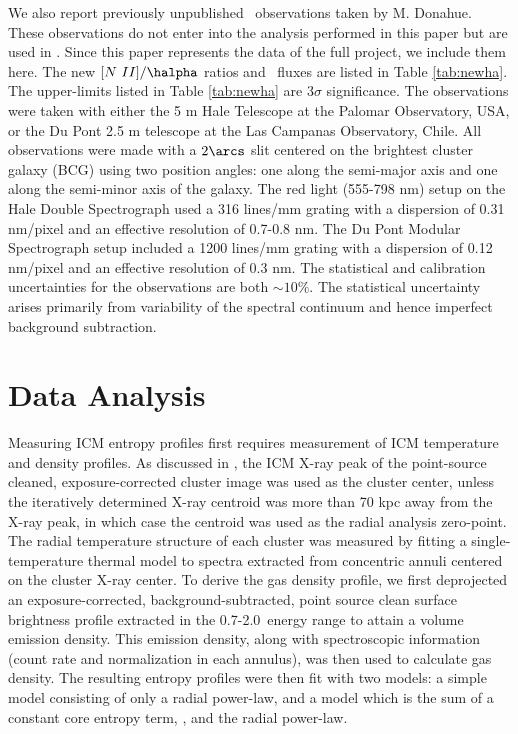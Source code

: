 \documentclass{emulateapj}
\begin{document}
We also report previously unpublished \halpha\ observations taken by
M. Donahue. These observations do not enter into the analysis
performed in this paper but are used in \citet{haradent}. Since this
paper represents the data of the full project, we include them
here. The new $[N~II]/\halpha$ ratios and \halpha\ fluxes are listed
in Table \ref{tab:newha}. The upper-limits listed in Table
\ref{tab:newha} are $3\sigma$ significance. The observations were
taken with either the 5 m Hale Telescope at the Palomar Observatory,
USA, or the Du Pont 2.5 m telescope at the Las Campanas Observatory,
Chile. All observations were made with a $2\arcs$ slit centered on the
brightest cluster galaxy (BCG) using two position angles: one along
the semi-major axis and one along the semi-minor axis of the
galaxy. The red light (555-798 nm) setup on the Hale Double
Spectrograph used a 316 lines/mm grating with a dispersion of 0.31
nm/pixel and an effective resolution of 0.7-0.8 nm. The Du Pont
Modular Spectrograph setup included a 1200 lines/mm grating with a
dispersion of 0.12 nm/pixel and an effective resolution of 0.3 nm. The
statistical and calibration uncertainties for the observations are
both $\sim 10\%$. The statistical uncertainty arises primarily from
variability of the spectral continuum and hence imperfect background
subtraction.

\section{Data Analysis}
\label{sec:data}

Measuring ICM entropy profiles first requires measurement of ICM
temperature and density profiles. As discussed in \citet{xrayband},
the ICM X-ray peak of the point-source cleaned, exposure-corrected
cluster image was used as the cluster center, unless the iteratively
determined X-ray centroid was more than 70 kpc away from the X-ray
peak, in which case the centroid was used as the radial analysis
zero-point. The radial temperature structure of each cluster was
measured by fitting a single-temperature thermal model to spectra
extracted from concentric annuli centered on the cluster X-ray
center. To derive the gas density profile, we first deprojected an
exposure-corrected, background-subtracted, point source clean surface
brightness profile extracted in the 0.7-2.0\keV\ energy range to
attain a volume emission density. This emission density, along with
spectroscopic information (count rate and normalization in each
annulus), was then used to calculate gas density. The resulting
entropy profiles were then fit with two models: a simple model
consisting of only a radial power-law, and a model which is the sum of
a constant core entropy term, \kna, and the radial power-law.
\end{document}
